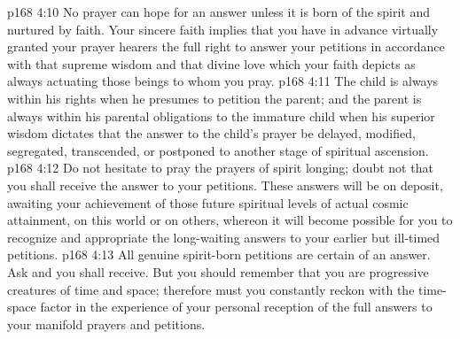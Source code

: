 \vs p168 4:10 \bibnobreakspace No prayer can hope for an answer unless it is born of the spirit and nurtured by faith. Your sincere faith implies that you have in advance virtually granted your prayer hearers the full right to answer your petitions in accordance with that supreme wisdom and that divine love which your faith depicts as always actuating those beings to whom you pray.
\vs p168 4:11 \bibnobreakspace The child is always within his rights when he presumes to petition the parent; and the parent is always within his parental obligations to the immature child when his superior wisdom dictates that the answer to the child’s prayer be delayed, modified, segregated, transcended, or postponed to another stage of spiritual ascension.
\vs p168 4:12 \bibnobreakspace Do not hesitate to pray the prayers of spirit longing; doubt not that you shall receive the answer to your petitions. These answers will be on deposit, awaiting your achievement of those future spiritual levels of actual cosmic attainment, on this world or on others, whereon it will become possible for you to recognize and appropriate the long\hyp{}waiting answers to your earlier but ill\hyp{}timed petitions.
\vs p168 4:13 \bibnobreakspace All genuine spirit\hyp{}born petitions are certain of an answer. Ask and you shall receive. But you should remember that you are progressive creatures of time and space; therefore must you constantly reckon with the time\hyp{}space factor in the experience of your personal reception of the full answers to your manifold prayers and petitions.
